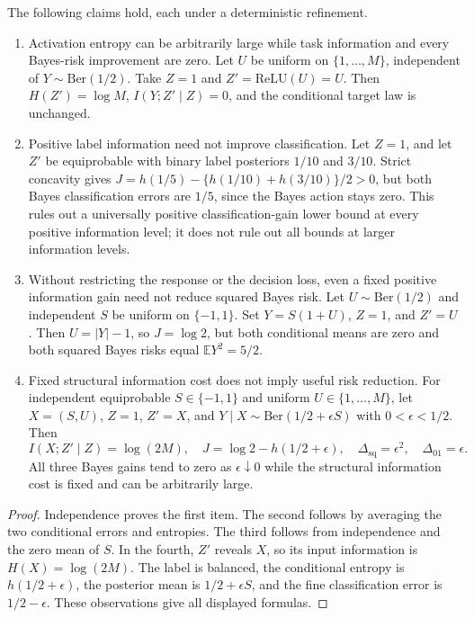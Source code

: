 \begin{proposition}
\label{prop:p7-counterexamples}
The following claims hold, each under a deterministic refinement.
\begin{enumerate}
\item Activation entropy can be arbitrarily large while task information
and every Bayes-risk improvement are zero. Let $U$ be uniform on
$\{1,\ldots,M\}$, independent of $Y\sim\mathrm{Ber}(1/2)$.
Take $Z=1$ and $Z'=\mathrm{ReLU}(U)=U$. Then
$H(Z')=\log M$, $I(Y;Z'\mid Z)=0$, and the conditional target law
is unchanged.
\item Positive label information need not improve classification. Let
$Z=1$, and let $Z'$ be equiprobable with binary label posteriors
$1/10$ and $3/10$. Strict concavity gives
$J=h(1/5)-\{h(1/10)+h(3/10)\}/2>0$, but both Bayes classification
errors are $1/5$, since the Bayes action stays zero. This rules out
a universally positive classification-gain lower bound at every
positive information level; it does not rule out all bounds at larger
information levels.
\item Without restricting the response or the decision loss, even a
fixed positive information gain need not reduce squared Bayes risk.
Let $U\sim\mathrm{Ber}(1/2)$ and independent $S$ be uniform on
$\{-1,1\}$. Set $Y=S(1+U)$, $Z=1$, and $Z'=U$.
Then $U=|Y|-1$, so $J=\log2$, but both conditional means are zero
and both squared Bayes risks equal $\mathbb E Y^2=5/2$.
\item Fixed structural information cost does not imply useful risk
reduction. For independent equiprobable $S\in\{-1,1\}$ and uniform
$U\in\{1,\ldots,M\}$, let $X=(S,U)$, $Z=1$, $Z'=X$, and
$Y\mid X\sim\mathrm{Ber}(1/2+\epsilon S)$ with
$0<\epsilon<1/2$. Then
\[
 I(X;Z'\mid Z)=\log(2M),\quad
 J=\log2-h(1/2+\epsilon),\quad
 \Delta_{\mathrm{sq}}=\epsilon^2,\quad\Delta_{01}=\epsilon.
\]
All three Bayes gains tend to zero as $\epsilon\downarrow0$ while
the structural information cost is fixed and can be arbitrarily large.
\end{enumerate}
\end{proposition}
\begin{proof}
Independence proves the first item. The second follows by averaging the
two conditional errors and entropies. The third follows from independence
and the zero mean of $S$. In the fourth, $Z'$ reveals $X$, so its input
information is $H(X)=\log(2M)$. The label is balanced, the conditional
entropy is $h(1/2+\epsilon)$, the posterior mean is $1/2+\epsilon S$,
and the fine classification error is $1/2-\epsilon$. These observations
give all displayed formulas.
\end{proof}

